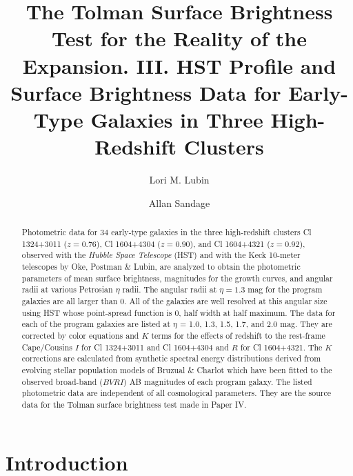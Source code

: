 \documentclass[preprint]{aastex}
\begin{document}
\title{The Tolman Surface Brightness Test for the Reality of the Expansion. 
III. HST Profile and Surface Brightness Data for Early-Type Galaxies in
Three High-Redshift Clusters}

\author{Lori M. Lubin} 

 

\author{Allan Sandage} 

\begin{abstract}

Photometric data for 34 early-type galaxies in the three high-redshift
clusters Cl 1324+3011 ($z = 0.76$), Cl 1604+4304 ($z = 0.90$), and Cl
1604+4321 ($z = 0.92$), observed with the {\it Hubble Space Telescope}
(HST) and with the Keck 10-meter telescopes by Oke, Postman \& Lubin,
are analyzed to obtain the photometric parameters of mean surface
brightness, magnitudes for the growth curves, and angular radii at
various Petrosian $\eta$ radii. The angular radii at $\eta = 1.3$ mag
for the program galaxies are all larger than 0. All of the
galaxies are well resolved at this angular size using HST whose
point-spread function is 0, half width at half maximum. The
data for each of the program galaxies are listed at $\eta$ = 1.0, 1.3,
1.5, 1.7, and 2.0 mag. They are corrected by color equations and $K$
terms for the effects of redshift to the rest-frame Cape/Cousins $I$
for Cl 1324+3011 and Cl 1604+4304 and $R$ for Cl 1604+4321. The $K$
corrections are calculated from synthetic spectral energy
distributions derived from evolving stellar population models of
Bruzual \& Charlot which have been fitted to the observed broad-band
($BVRI$) AB magnitudes of each program galaxy.  The listed photometric
data are independent of all cosmological parameters. They are the
source data for the Tolman surface brightness test made in Paper IV.

\end{abstract}


\section{Introduction}
\end{document}
